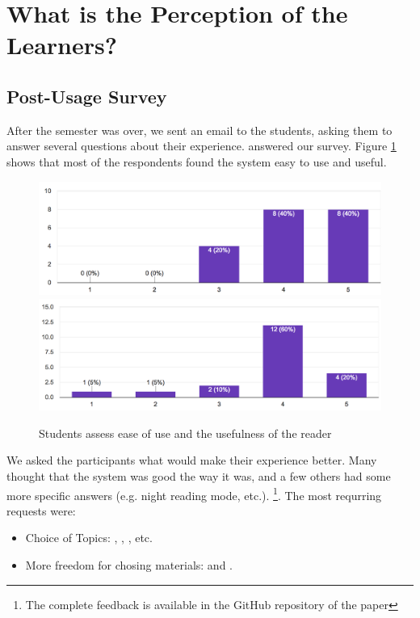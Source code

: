 
\newpage
\section{What is the Perception of the Learners?}
\label{sec:perception}

\subsection{Post-Usage Survey}

After the semester was over, we sent an email to the students, asking them to answer several questions about their experience. \surveyrespondents answered our survey. Figure \ref{fig:reader_use} shows that most of the respondents found the system easy to use and useful. 

 \begin{figure}[h!]
    \centering
      \includegraphics[width=0.8\columnwidth]{figures/opinions/reader_ease_of_use}
      \includegraphics[width=0.8\columnwidth]{figures/opinions/reader_usefulness}
      \caption{Students assess ease of use and the usefulness of the reader}
      \label{fig:reader_use}
    \end{figure}

We asked the participants what would make their experience better. Many thought that the system was good the way it was, and a few others had some more specific answers (e.g. night reading mode, etc.). \footnote{The complete feedback is available in the GitHub repository of the paper}. The most requrring requests were: 

\begin{itemize}
	\item Choice of Topics: 
		, 
		, 
		, etc.
	\item More freedom for chosing materials: 
		 and 
		. 
\end{itemize}

